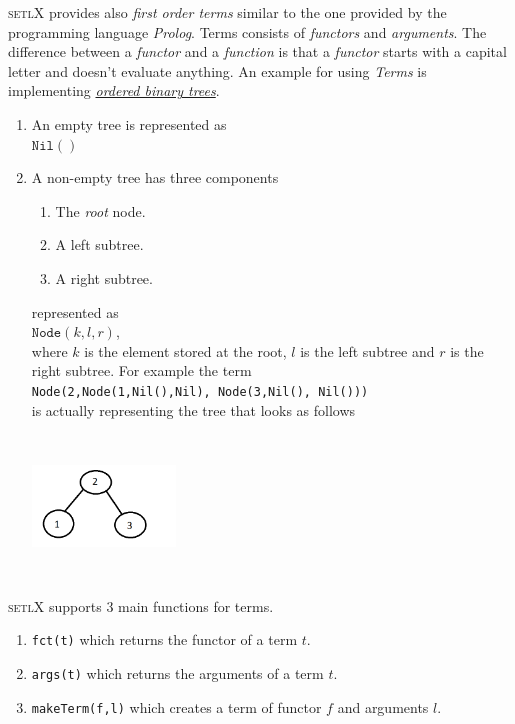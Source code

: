 \documentclass[11pt]{report}
\begin{document}
\textsc{setlX} provides also \textsl{first order terms} similar to the one provided by the programming language \textsl{Prolog}. Terms consists of \textsl{functors} and \textsl{arguments}. The difference between a \textsl{functor} and a \textsl{function} is that a \textsl{functor} starts with a capital letter and doesn't evaluate anything. An example for using \textsl{Terms} is implementing \href{http://en.wikipedia.org/wiki/Binary_search_tree}{\emph{ordered binary trees}}.
\begin{enumerate}
\item An empty tree is represented as
      \\[0.2cm]
      \hspace*{1.3cm}
      $\mathtt{Nil()}$
      \\[0.2cm]
\item A non-empty tree has three components
      \begin{enumerate}
      \item The \emph{root} node.
      \item A left subtree.
      \item A right subtree.
      \end{enumerate}
represented as 
	  \\[0.2cm]
      \hspace*{1.3cm}
      $\texttt{Node}(k, l, r)$,
      \\[0.2cm]
where $k$ is the element stored at the root, $l$ is the left subtree and $r$ is the right subtree. For example the term
\\[0.2cm]
\hspace*{1.3cm}
\texttt{Node(2,Node(1,Nil(),Nil), Node(3,Nil(), Nil()))}
\\[0.2cm]
is actually representing the tree that looks as follows
\begin{center} \includegraphics[width=1.5in, height=1.5in, scale=1, angle=0]{binary-tree.png} \end{center}
\end{enumerate}
\textsc{setlX} supports 3 main functions for terms.
\begin{enumerate}
\item \texttt{fct(t)} which returns the functor of a term $t$.
\item \texttt{args(t)} which returns the arguments of a term $t$.
\item \texttt{makeTerm(f,l)} which creates a term of functor $f$ and arguments $l$.
\end{enumerate}
\end{document}
